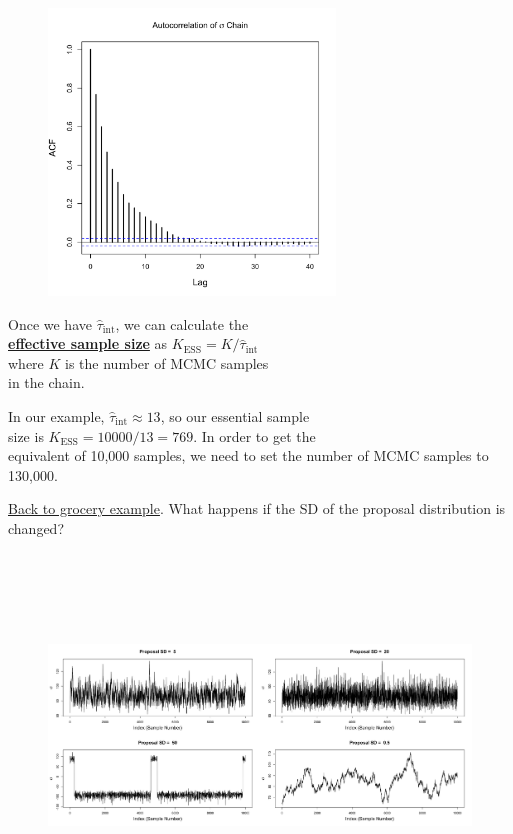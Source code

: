\documentclass[11pt]{article}
\newcommand{\ub}[1]{{\bf \uline{#1}}}
\begin{document}
\vspace{-.4in}
\begin{figure}[H]
\raggedleft
\includegraphics[width=3in]{bayes_figs/ACF.pdf} 
\end{figure}

\vspace{-1.5in}
Once we have $\hat{\tau}_{\text{int}}$, we can calculate the\\
\ub{effective sample size} as $K_{\text{ESS}}=K/\hat{\tau}_{\text{int}}$\\
where $K$ is the number of MCMC samples\\
in the chain.

In our example, $\hat{\tau}_{\text{int}}\approx 13$, so our essential sample\\
size is  $K_{\text{ESS}}=10000/13=769$. In order to get the\\
equivalent of 10,000 samples, we need to set the number of MCMC samples to 130,000.

\newpage

\uline{Back to grocery example}. What happens if the SD of the proposal distribution is changed?
\vspace{-.1in}
\begin{figure}[H]
\centering
\includegraphics[width=6in,height=3.8in]{bayes_figs/Plots_differentSDs.png} 
\end{figure}
\end{document}
